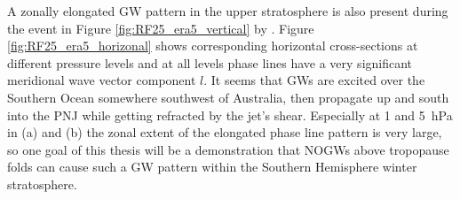 A zonally elongated GW pattern in the upper stratosphere is also present during the event in Figure \ref{fig:RF25_era5_vertical} by \textcite[]{dornbrack_stratospheric_2022}. Figure \ref{fig:RF25_era5_horizonal} shows corresponding horizontal cross-sections at different pressure levels and at all levels phase lines have a very significant meridional wave vector component $l$. It seems that GWs are excited over the Southern Ocean somewhere southwest of Australia, then propagate up and south into the PNJ while getting refracted by the jet's shear. Especially at 1 and \SI{5}{hPa} in (a) and (b) the zonal extent of the elongated phase line pattern is very large, so one goal of this thesis will be a demonstration that NOGWs above tropopause folds can cause such a GW pattern within the Southern Hemisphere winter stratosphere.  

